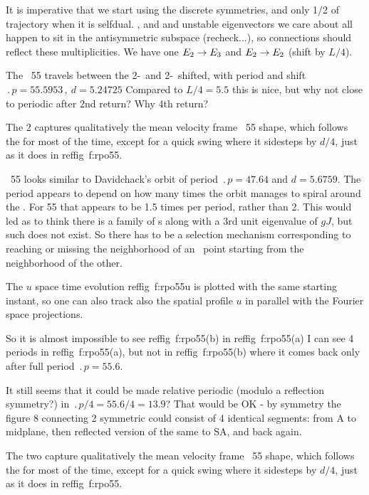 It is imperative that we start using the discrete symmetries, and only 1/2
of trajectory when it is selfdual.
,  and  and unstable eigenvectors
we care about all happen to sit in the antisymmetric subspace
(recheck...), so connections should reflect these multiplicities. We have
one $E_{2} \to E_{3}$ and $E_{2} \to E_{2}$ (shift by $L/4$).

The \rpo\ {\nameit}55 travels between the 2-\eqv\  and
2-\eqv\ shifted,
with period and shift
$\period{p}=55.5953\,,\ d=5.24725$
Compared to $L/4 = 5.5$
this is nice, but why not close to periodic after 2nd return? Why 4th return?

The {\nameit}2 {\eqv}
captures qualitatively the mean velocity frame \rpo\ {\nameit}55 shape,
which follows the
{\eqv} for most of the time, except for a quick swing where it
sidesteps by $d/4$, just as it does in reffig~{f:rpo55}.

\Rpo\ {\nameit}55 looks similar to Davidchack's  orbit
of period
$\period{p}=47.64$ and $d=5.6759$. The period appears to depend on how
many times the orbit manages to spiral around the \eqv.
For {\nameit}55 that appears to be
1.5 times per period, rather than 2. This would led as
to
think there is a family of \rpo s along with a 3rd unit eigenvalue of
$gJ$,
but such does not exist.
So there has to be a selection mechanism corresponding to
reaching or missing the neighborhood of an \eqv\  point starting from
the neighborhood of the other.

The $u$ space time evolution reffig~{f:rpo55u} %
is plotted with the same starting instant,
so one can also track also the spatial profile $u$ in parallel with
the Fourier space projections.

So it is almost impossible to see reffig~{f:rpo55}(b) %
in reffig~{f:rpo55}(a) %
I can see 4 periods in reffig~{f:rpo55}(a), %
but not in reffig~{f:rpo55}(b) %
where it comes back only after full period $\period{p}=55.6$.

It still seems that it could be made relative periodic
(modulo a reflection symmetry?)
in $\period{p}/4=55.6/4=13.9$? That would be OK
-
by symmetry the figure 8 connecting
2 symmetric {\eqva} could consist of 4 identical segments: from
{\eqv} A to midplane, then reflected version of the same to SA, and
back again.

The two {\eqva}
capture qualitatively the mean velocity frame \rpo\ {\nameit}55 shape,
which follows the
{\eqv} for most of the time, except for a quick swing where it
sidesteps by $d/4$, just as it does in reffig~{f:rpo55}.

